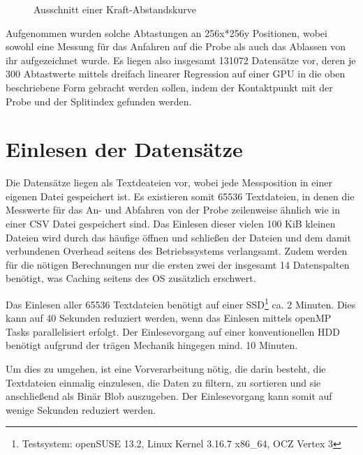 \begin{figure}[h!]
\centering
\caption{Ausschnitt einer Kraft-Abstandskurve}
\label{fig:kraftbsp}
\end{figure}

Aufgenommen wurden solche Abtastungen an 256x*256y Positionen, wobei sowohl eine Messung für das Anfahren auf die Probe als auch das Ablassen von ihr aufgezeichnet wurde. Es liegen also insgesamt 131072 Datensätze vor, deren je 300 Abtastwerte mittels dreifach linearer Regression auf einer GPU in die oben beschriebene Form gebracht werden sollen, indem der Kontaktpunkt mit der Probe und der Splitindex gefunden werden.

\pagebreak
\section{Einlesen der Datensätze}
\label{einlesen}
Die Datensätze liegen als Textdeateien vor, wobei jede Messposition in einer eigenen Datei gespeichert ist. Es existieren somit 65536 Textdateien, in denen die Messwerte für das An- und Abfahren von der Probe zeilenweise ähnlich wie in einer CSV Datei gespeichert sind.
Das Einlesen dieser vielen 100 KiB kleinen Dateien wird durch das häufige öffnen und schließen der Dateien und dem damit verbundenen Overhead seitens des Betriebssystems verlangsamt. Zudem werden für die nötigen Berechnungen nur die ersten zwei der insgesamt 14 Datenspalten benötigt, was Caching seitens des OS zusätzlich erschwert.


Das Einlesen aller 65536 Textdateien benötigt auf einer SSD\footnote{Testsystem: openSUSE 13.2, Linux Kernel 3.16.7 x86\_64, OCZ Vertex 3} ca. 2 Minuten. Dies kann auf 40 Sekunden reduziert werden, wenn das Einlesen mittels openMP Tasks parallelisiert erfolgt.
Der Einlesevorgang auf einer konventionellen HDD benötigt aufgrund der trägen Mechanik hingegen mind. 10 Minuten.

Um dies zu umgehen, ist eine Vorverarbeitung nötig, die darin besteht, die Textdateien einmalig einzulesen, die Daten zu filtern, zu sortieren und sie anschließend als Binär Blob auszugeben. Der Einlesevorgang kann somit auf wenige Sekunden reduziert werden.

